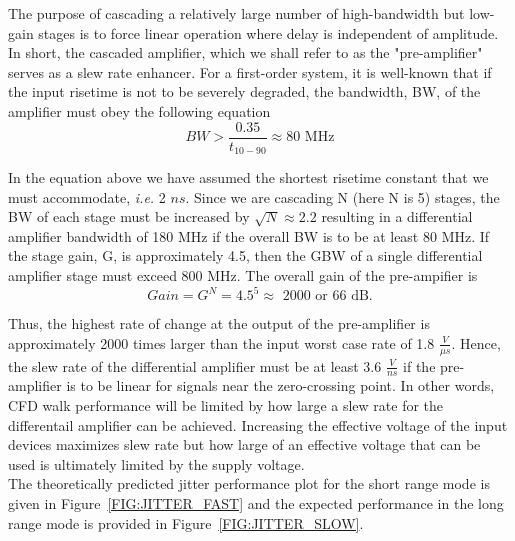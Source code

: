 \documentclass[12pt, onecolumn]{IEEEtran}
\begin{document}
The purpose of cascading a relatively large number of high-bandwidth but low-gain stages is to force linear operation where delay is independent of amplitude. In short, the cascaded amplifier, which we shall refer to as the "pre-amplifier" serves as a slew rate enhancer.  For a first-order system, it is well-known that if the input risetime is not to be severely degraded, the bandwidth, BW, of the amplifier must obey the following equation\\

\begin{equation}
BW > \frac{0.35}{t_{10-90}} \approx \text{80 MHz}
\end{equation}


In the equation above we have assumed the shortest risetime constant that we must accommodate, \emph{i.e.}  2 $ns$. Since we are cascading N (here N is 5) stages, the BW of each stage must be increased by $\sqrt{N} \approx 2.2$ resulting in a differential amplifier bandwidth of 180 MHz if the overall BW is to be at least 80 MHz.  If the stage gain, G, is approximately 4.5, then the GBW of a single differential amplifier stage must exceed 800 MHz. The overall gain of the pre-ampifier is \\

\begin{equation}
Gain = G^N = 4.5^5 \approx \text{ 2000 or 66 dB}.
\end{equation}

Thus, the highest rate of change at the output of the pre-amplifier is approximately 2000 times larger than the input worst case rate of 1.8 $\frac{V}{\mu s}$.  Hence, the slew rate of the differential amplifier must be at least 3.6 $\frac{V}{ns}$ if the pre-amplifier is to be linear for signals near the zero-crossing point. In other words, CFD walk performance will be limited by how large a slew rate for the differentail amplifier can be achieved. Increasing the effective voltage of the input devices maximizes slew rate but how large of an effective voltage that can be used is ultimately limited by the supply voltage.\\


The theoretically predicted jitter performance plot for the short range mode is given in Figure~\ref{FIG:JITTER_FAST} and the expected performance in the long range mode is provided in Figure~\ref{FIG:JITTER_SLOW}.\\
\end{document}
